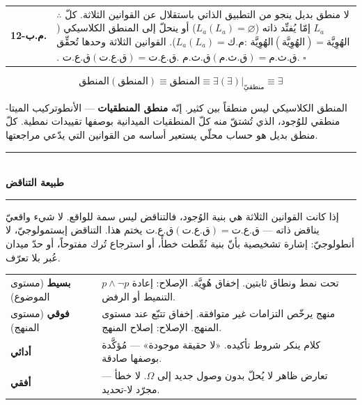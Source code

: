 \documentclass[10pt, openany, oneside]{book}
\renewcommand{\normalsize}{\fontsize{10}{13}\selectfont}
\renewcommand{\footnotesize}{\fontsize{8.5}{11}\selectfont}
\begin{document}
{\begin{tabular}{r p{}}
\textbf{م.ب-12.} & $\therefore$ لا منطق بديل ينجو من التطبيق الذاتي باستقلال عن القوانين الثلاثة. كلّ $L_a$ إمّا يُفنِّد ذاته ($L_a(L_a) = \varnothing$) أو ينحلّ إلى المنطق الكلاسيكي ($L_a(L_a) = \text{م.ك}$). القوانين الثلاثة وحدها تُحقِّق: $\text{الهُوِيَّة}(\text{الهُوِيَّة}) = \text{الهُوِيَّة}$. $\text{ق.ع.ت}(\text{ق.ع.ت}) = \text{ق.ع.ت}$. $\text{ق.ث.م}(\text{ق.ث.م}) = \text{ق.ث.م}$. $\square$ \\[0.3em]
\end{tabular}
}

\vspace{0.8em}

$$\text{المنطق}(\text{المنطق}) \equiv \text{المنطق} \equiv \exists(\exists)|_{\text{منطقيّ}} \equiv \exists$$

\noindent المنطق الكلاسيكي ليس منطقاً بين كثير. إنّه \textbf{منطق المنطقيات} --- الأنطوتركيب الميتا-منطقي للوُجود، الذي تُشتقّ منه كلّ المنطقيات الميدانية بوصفها تقييدات نمطية. كلّ منطق بديل هو حساب محلّي يستعير أساسه من القوانين التي يدّعي مراجعتها.

\vspace{1.5em}


\begin{center}
    \rule{0.3\textwidth}{0.4pt}\\[0.5em]
    {\normalsize\bfseries طبيعة التناقض}\\[0.3em]
    \rule{0.3\textwidth}{0.4pt}
\end{center}

\vspace{1em}

\noindent إذا كانت القوانين الثلاثة هي بنية الوُجود، فالتناقض ليس سمة للواقع. لا شيء واقعيّ يناقض ذاته --- $\text{ق.ع.ت}(\text{ق.ع.ت}) = \text{ق.ع.ت}$ يختم هذا. التناقض إبستمولوجيّ، لا أنطولوجيّ: إشارة تشخيصية بأنّ بنية نُمِّطت خطأً، أو استرجاع تُرك مفتوحاً، أو حدّ ميدان عُبر بلا تعرّف.

\vspace{0.3em}

{\footnotesize
\noindent\begin{tabular}{p{3cm} p{}}
\textbf{بسيط} (مستوى الموضوع) & $p \wedge \neg p$ تحت نمط ونطاق ثابتين. إخفاق هُوِيَّة. الإصلاح: إعادة التنميط أو الرفض. \\[0.3em]
\textbf{فوقي} (مستوى المنهج) & منهج يرخّص التزامات غير متوافقة. إخفاق تتبّع عند مستوى المنهج. الإصلاح: إصلاح المنهج. \\[0.3em]
\textbf{أدائي} & كلام ينكر شروط تأكيده. «لا حقيقة موجودة» --- مُؤكَّدة بوصفها صادقة. \\[0.3em]
\textbf{أفقي} & تعارض ظاهر لا يُحلّ بدون وصول جديد إلى $\Omega$. لا خطأ --- مجرّد لا-تحديد. \\[0.3em]
\end{tabular}
}
\end{document}
